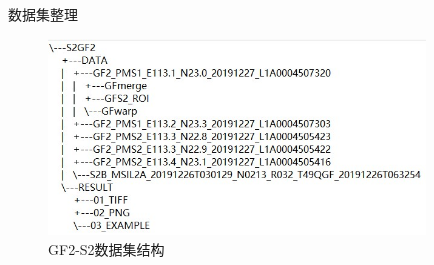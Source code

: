 \begin{frame}{数据集整理}
    \begin{figure}
        \centering
        \includegraphics[width=10cm]{pic/pic0102gf2.jpg}
        \caption{GF2-S2数据集结构}
        \label{fig:0102b}
    \end{figure}
\end{frame}






